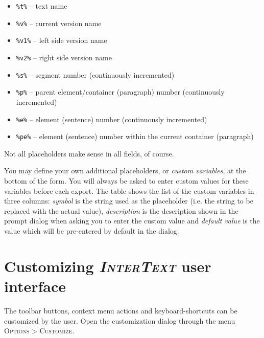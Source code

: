 \documentclass[a4paper,10pt,oneside]{book}
\newcommand{\IT}{\textit{\textsc{InterText}}\xspace}
\newcommand{\menu}[1]{\textsc{#1}}
\begin{document}
\begin{itemize}
 \item \texttt{\%t\%} -- text name
 \item \texttt{\%v\%} -- current version name
 \item \texttt{\%v1\%} -- left side version name
 \item \texttt{\%v2\%} -- right side version name
 \item \texttt{\%s\%} -- segment number (continuously incremented)
 \item \texttt{\%p\%} -- parent element/container (paragraph) number (continuously incremented)
 \item \texttt{\%e\%} -- element (sentence) number (continuously incremented)
 \item \texttt{\%pe\%} -- element (sentence) number within the current container (paragraph)
\end{itemize}

Not all placeholders make sense in all fields, of course.

You may define your own additional placeholders, or \emph{custom variables}, at the bottom of the form. You will always be asked to enter custom values for these variables before each export. The table shows the list of the custom variables in three columns: \emph{symbol} is the string used as the placeholder (i.e. the string to be replaced with the actual value), \emph{description} is the description shown in the prompt dialog when asking you to enter the custom value and \emph{default value} is the value which will be pre-entered by default in the dialog.


\chapter{Customizing \IT user interface}\label{ch:detail:custom}

The toolbar buttons, context menu actions and keyboard-shortcuts can be customized by the user. Open the customization dialog through the menu \menu{Options} > \menu{Customize}.
\end{document}
